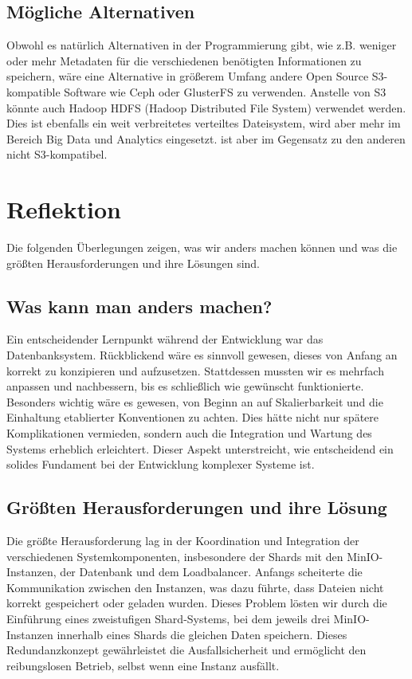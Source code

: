 \documentclass[12pt]{report}
\begin{document}
	\section{Mögliche Alternativen}
		Obwohl es natürlich Alternativen in der Programmierung gibt, wie z.B. weniger oder mehr Metadaten für die verschiedenen benötigten Informationen zu speichern, wäre eine Alternative in größerem Umfang andere Open Source S3-kompatible Software wie Ceph oder GlusterFS zu verwenden. Anstelle von S3 könnte auch Hadoop HDFS (Hadoop Distributed File System) verwendet werden. Dies ist ebenfalls ein weit verbreitetes verteiltes Dateisystem, wird aber mehr im Bereich Big Data und Analytics eingesetzt. ist aber im Gegensatz zu den anderen nicht S3-kompatibel.
	
\chapter{Reflektion}
	Die folgenden Überlegungen zeigen, was wir anders machen können und was die größten Herausforderungen und ihre Lösungen sind.
	
	\section{Was kann man anders machen?}
	Ein entscheidender Lernpunkt während der Entwicklung war das Datenbanksystem. Rückblickend wäre es sinnvoll gewesen, dieses von Anfang an korrekt zu konzipieren und aufzusetzen. Stattdessen mussten wir es mehrfach anpassen und nachbessern, bis es schließlich wie gewünscht funktionierte. Besonders wichtig wäre es gewesen, von Beginn an auf Skalierbarkeit und die Einhaltung etablierter Konventionen zu achten. Dies hätte nicht nur spätere Komplikationen vermieden, sondern auch die Integration und Wartung des Systems erheblich erleichtert. Dieser Aspekt unterstreicht, wie entscheidend ein solides Fundament bei der Entwicklung komplexer Systeme ist.
	
	\section{Größten Herausforderungen und ihre Lösung}
	Die größte Herausforderung lag in der Koordination und Integration der verschiedenen Systemkomponenten, insbesondere der Shards mit den MinIO-Instanzen, der Datenbank und dem Loadbalancer. Anfangs scheiterte die Kommunikation zwischen den Instanzen, was dazu führte, dass Dateien nicht korrekt gespeichert oder geladen wurden. Dieses Problem lösten wir durch die Einführung eines zweistufigen Shard-Systems, bei dem jeweils drei MinIO-Instanzen innerhalb eines Shards die gleichen Daten speichern. Dieses Redundanzkonzept gewährleistet die Ausfallsicherheit und ermöglicht den reibungslosen Betrieb, selbst wenn eine Instanz ausfällt.
	
\end{document}
